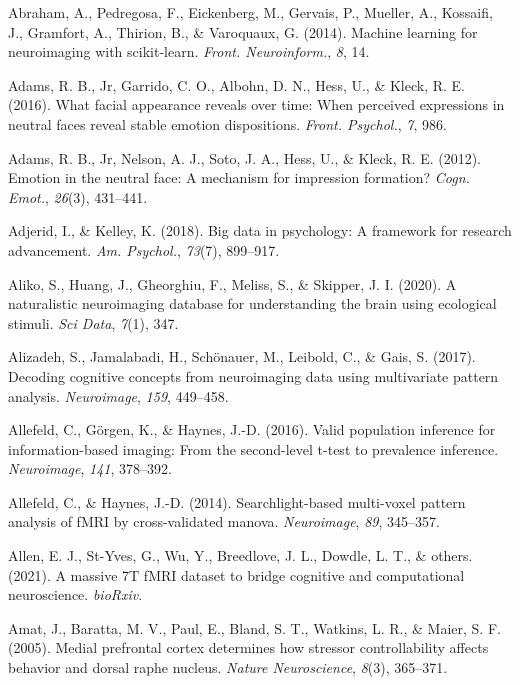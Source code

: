 \documentclass[12pt,american,a4paper,oneside,]{memoir} %
\begin{document}
\leavevmode\hypertarget{ref-Abraham2014-ef}{}%
Abraham, A., Pedregosa, F., Eickenberg, M., Gervais, P., Mueller, A., Kossaifi, J., Gramfort, A., Thirion, B., \& Varoquaux, G. (2014). Machine learning for neuroimaging with scikit-learn. \emph{Front. Neuroinform.}, \emph{8}, 14.

\leavevmode\hypertarget{ref-Adams2016-tz}{}%
Adams, R. B., Jr, Garrido, C. O., Albohn, D. N., Hess, U., \& Kleck, R. E. (2016). What facial appearance reveals over time: When perceived expressions in neutral faces reveal stable emotion dispositions. \emph{Front. Psychol.}, \emph{7}, 986.

\leavevmode\hypertarget{ref-Adams2012-dl}{}%
Adams, R. B., Jr, Nelson, A. J., Soto, J. A., Hess, U., \& Kleck, R. E. (2012). Emotion in the neutral face: A mechanism for impression formation? \emph{Cogn. Emot.}, \emph{26}(3), 431--441.

\leavevmode\hypertarget{ref-Adjerid2018-vs}{}%
Adjerid, I., \& Kelley, K. (2018). Big data in psychology: A framework for research advancement. \emph{Am. Psychol.}, \emph{73}(7), 899--917.

\leavevmode\hypertarget{ref-Aliko2020-ry}{}%
Aliko, S., Huang, J., Gheorghiu, F., Meliss, S., \& Skipper, J. I. (2020). A naturalistic neuroimaging database for understanding the brain using ecological stimuli. \emph{Sci Data}, \emph{7}(1), 347.

\leavevmode\hypertarget{ref-alizadeh2017decoding}{}%
Alizadeh, S., Jamalabadi, H., Schönauer, M., Leibold, C., \& Gais, S. (2017). Decoding cognitive concepts from neuroimaging data using multivariate pattern analysis. \emph{Neuroimage}, \emph{159}, 449--458.

\leavevmode\hypertarget{ref-Allefeld2016-xp}{}%
Allefeld, C., Görgen, K., \& Haynes, J.-D. (2016). Valid population inference for information-based imaging: From the second-level t-test to prevalence inference. \emph{Neuroimage}, \emph{141}, 378--392.

\leavevmode\hypertarget{ref-allefeld2014searchlight}{}%
Allefeld, C., \& Haynes, J.-D. (2014). Searchlight-based multi-voxel pattern analysis of fMRI by cross-validated manova. \emph{Neuroimage}, \emph{89}, 345--357.

\leavevmode\hypertarget{ref-Allen2021-zd}{}%
Allen, E. J., St-Yves, G., Wu, Y., Breedlove, J. L., Dowdle, L. T., \& others. (2021). A massive 7T fMRI dataset to bridge cognitive and computational neuroscience. \emph{bioRxiv}.

\leavevmode\hypertarget{ref-amat2005medial}{}%
Amat, J., Baratta, M. V., Paul, E., Bland, S. T., Watkins, L. R., \& Maier, S. F. (2005). Medial prefrontal cortex determines how stressor controllability affects behavior and dorsal raphe nucleus. \emph{Nature Neuroscience}, \emph{8}(3), 365--371.
\end{document}
